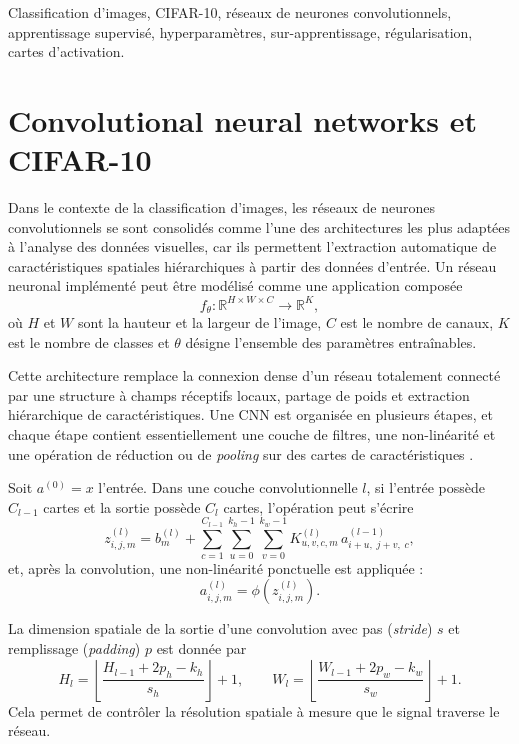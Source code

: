 \documentclass[conference]{IEEEtran}
\begin{document}
\begin{IEEEkeywords}
Classification d'images, CIFAR-10, r\'eseaux de neurones convolutionnels, apprentissage supervis\'e, hyperparam\`etres, sur-apprentissage, r\'egularisation, cartes d'activation.
\end{IEEEkeywords}
\section{Convolutional neural networks et CIFAR-10}
Dans le contexte de la classification d’images, les réseaux de neurones convolutionnels se sont consolidés comme l’une des architectures les plus adaptées à l’analyse des données visuelles, car ils permettent l’extraction automatique de caractéristiques spatiales hiérarchiques à partir des données d’entrée. Un réseau neuronal implémenté peut être modélisé comme une application composée
\begin{equation}
f_{\theta}:\mathbb{R}^{H\times W\times C}\rightarrow \mathbb{R}^{K},
\label{eq:cnn_mapping}
\end{equation}
où $H$ et $W$ sont la hauteur et la largeur de l’image, $C$ est le nombre de canaux, $K$ est le nombre de classes et $\theta$ désigne l’ensemble des paramètres entraînables.

Cette architecture remplace la connexion dense d’un réseau totalement connecté par une structure à champs réceptifs locaux, partage de poids et extraction hiérarchique de caractéristiques. Une CNN est organisée en plusieurs étapes, et chaque étape contient essentiellement une couche de filtres, une non-linéarité et une opération de réduction ou de \textit{pooling} sur des cartes de caractéristiques \cite{lecun_convolutional_networks}.

Soit $a^{(0)}=x$ l’entrée. Dans une couche convolutionnelle $l$, si l’entrée possède $C_{l-1}$ cartes et la sortie possède $C_l$ cartes, l’opération peut s’écrire
\begin{equation}
z^{(l)}_{i,j,m}
=
b^{(l)}_{m}
+
\sum_{c=1}^{C_{l-1}}
\sum_{u=0}^{k_h-1}
\sum_{v=0}^{k_w-1}
K^{(l)}_{u,v,c,m}\,
a^{(l-1)}_{i+u,\;j+v,\;c},
\label{eq:conv_layer}
\end{equation}
et, après la convolution, une non-linéarité ponctuelle est appliquée :
\begin{equation}
a^{(l)}_{i,j,m}
=
\phi\!\left(z^{(l)}_{i,j,m}\right).
\label{eq:nonlinearity}
\end{equation}

La dimension spatiale de la sortie d’une convolution avec pas (\textit{stride}) $s$ et remplissage (\textit{padding}) $p$ est donnée par
\begin{equation}
H_l=
\left\lfloor
\frac{H_{l-1}+2p_h-k_h}{s_h}
\right\rfloor+1,
\qquad
W_l=
\left\lfloor
\frac{W_{l-1}+2p_w-k_w}{s_w}
\right\rfloor+1.
\label{eq:conv_output_size}
\end{equation}
Cela permet de contrôler la résolution spatiale à mesure que le signal traverse le réseau.
\end{document}

